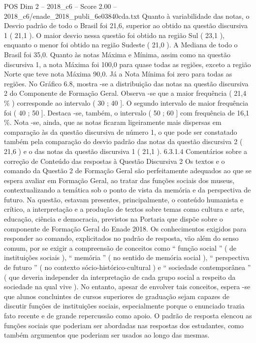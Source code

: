 \begin{textsample}{POS Dim 2 – 2018\_c6 – Score 2.00 – 2018\_c6/enade\_2018\_publi\_6e03840cda.txt}
Quanto à variabilidade das notas, o Desvio padrão de todo o Brasil foi 21,6, superior ao obtido na questão discursiva 1 ( 21,1 ).
O maior desvio nessa questão foi obtido na região Sul ( 23,1 ), enquanto o menor foi obtido na região Sudeste ( 21,0 ).
A Mediana de todo o Brasil foi 35,0.
Quanto às notas Máxima e Mínima, assim como na questão discursiva 1, a nota Máxima foi 100,0 para quase todas as regiões, exceto a região Norte que teve nota Máxima 90,0.
Já a Nota Mínima foi zero para todas as regiões.
No Gráfico 6.8, mostra -se a distribuição das notas na questão discursiva 2 do Componente de Formação Geral.
Observa -se que a maior frequência ( 21,4 \% ) corresponde ao intervalo ( 30 ; 40 ].
O segundo intervalo de maior frequência foi ( 40 ; 50 ].
Destaca -se, também, o intervalo ( 50 ; 60 ] com frequência de 16,1 \%.
Nota -se, ainda, que as notas ficaram ligeiramente mais dispersas em comparação às da questão discursiva de número 1, o que pode ser constatado também pela comparação do desvio padrão das notas da questão discursiva 2 ( 21,6 ) e o das notas da questão discursiva 1 ( 21,1 ). 6.3.1.4 Comentários sobre a correção de Conteúdo das respostas à Questão Discursiva 2 Os textos e o comando da Questão 2 de Formação Geral são perfeitamente adequados ao que se espera avaliar em Formação Geral, ao tratar das funções sociais dos museus, contextualizando a temática sob o ponto de vista da memória e da perspectiva de futuro.
Na questão, estavam presentes, principalmente, o conteúdo humanista e crítico, a interpretação e a produção de textos sobre temas como cultura e arte, educação, ciência e democracia, previstos na Portaria que dispõe sobre o componente de Formação Geral do Enade 2018.
Os conhecimentos exigidos para responder ao comando, explicitados no padrão de resposta, vão além do senso comum, por se exigir a compreensão de conceitos como “ função social ” ( de instituições sociais ), “ memória ” ( no sentido de memória social ), “ perspectiva de futuro ” ( no contexto sócio-histórico-cultural ) e “ sociedade contemporânea ” ( que deveria independer da interpretação de cada grupo social a respeito da sociedade na qual vive ).
No entanto, apesar de envolver tais conceitos, espera -se que alunos concluintes de cursos superiores de graduação sejam capazes de discutir funções de instituições sociais, especialmente porque o enunciado trazia fato recente e de grande repercussão como apoio.
O padrão de resposta elencou as funções sociais que poderiam ser abordadas nas respostas dos estudantes, como também argumentos que poderiam ser usados ao longo das mesmas.

\end{textsample}
